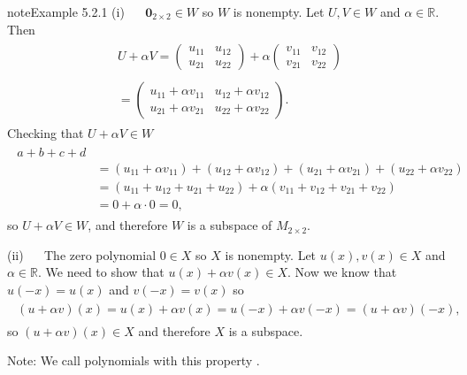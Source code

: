\documentclass[letterpaper,10pt,english]{jupyterBook}
\begin{document}
\begin{sphinxadmonition}{note}{Example 5.2.1}
\sphinxAtStartPar
(i)   \(\mathbf{0}_{2\times 2} \in W\) so \(W\) is non\sphinxhyphen{}empty. Let \(U, V \in W\) and \(\alpha \in \mathbb{R}\). Then
\begin{equation*}
\begin{split} \begin{align*}
    U + \alpha V =
    \begin{pmatrix} u_{11} & u_{12} \\ u_{21} & u_{22} \end{pmatrix} + \alpha
    \begin{pmatrix} v_{11} & v_{12} \\ v_{21} & v_{22} \end{pmatrix} \\ \\
    = \begin{pmatrix}
        u_{11} + \alpha v_{11} & u_{12} + \alpha v_{12} \\
        u_{21} + \alpha v_{21} & u_{22} + \alpha v_{22}
    \end{pmatrix}.
\end{align*} \end{split}
\end{equation*}
\sphinxAtStartPar
Checking that \(U + \alpha V \in W\)
\begin{equation*}
\begin{split} \begin{align*}
    a + b + c + d \\
    & = (u_{11} + \alpha v_{11}) + (u_{12} + \alpha v_{12}) + (u_{21} + \alpha v_{21}) + (u_{22} + \alpha v_{22}) \\
    & = (u_{11} + u_{12} + u_{21} + u_{22}) + \alpha (v_{11} + v_{12} + v_{21} + v_{22}) \\
    & = 0 + \alpha \cdot 0 = 0,
\end{align*} \end{split}
\end{equation*}
\sphinxAtStartPar
so \(U + \alpha V \in W\), and therefore \(W\) is a subspace of \(M_{2\times 2}\).

\sphinxAtStartPar
(ii)   The zero polynomial \(0 \in X\) so \(X\) is non\sphinxhyphen{}empty. Let \(u(x), v(x) \in X\) and \(\alpha \in \mathbb{R}\). We need to show that \(u(x) + \alpha v(x) \in X\). Now we know that \(u(-x) = u(x)\) and \(v(-x) = v(x)\) so
\begin{equation*}
\begin{split} \begin{align*}
    (u + \alpha v)(x) = u(x) + \alpha v(x) = u(-x) + \alpha v(-x) = (u + \alpha v)(-x),
\end{align*} \end{split}
\end{equation*}
\sphinxAtStartPar
so \((u + \alpha v)(x) \in X\) and therefore \(X\) is a subspace.

\sphinxAtStartPar
Note: We call polynomials with this property .
\end{sphinxadmonition}
\end{document}
